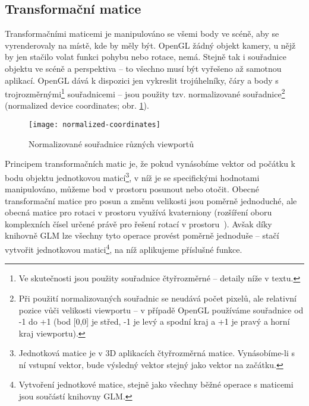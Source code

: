 \documentclass[a4paper, 11pt]{report}
\begin{document}
\subsection{Transformační matice}
Transformačními maticemi je manipulováno se všemi body ve scéně, aby se vyrenderovaly na místě, kde by měly být. OpenGL žádný objekt kamery, u nějž by jen stačilo volat funkci pohybu nebo rotace, nemá. Stejně tak i souřadnice objektu ve scéně a perspektiva -- to všechno musí být vyřešeno až samotnou aplikací. OpenGL dává k dispozici jen vykreslit trojúhelníky, čáry a body s trojrozměrnými\footnote{Ve skutečnosti jsou použity souřadnice čtyřrozměrné -- detaily níže v textu.} souřadnicemi -- jsou použity tzv. normalizované souřadnice\footnote{Při použití normalizovaných souřadnic se neudává počet pixelů, ale relativní pozice vůči velikosti viewportu -- v případě OpenGL používáme souřadnice od -1 do +1 (bod [0,0] je střed, -1 je levý a spodní kraj a +1 je pravý a horní kraj viewportu).} (normalized device coordinates; obr. \ref{normalized}). 

\begin{figure}[h]
	\centering
    \texttt{[image: normalized-coordinates]}
    \caption[Normalizované souřadnice]{\label{normalized}Normalizované souřadnice různých viewportů~\cite{pic:normalized-coordinates}}
\end{figure}

Principem transformačních matic je, že pokud vynásobíme vektor od počátku k bodu objektu jednotkovou maticí\footnote{Jednotková matice je v 3D aplikacích čtyřrozměrná matice. Vynásobíme-li s ní vstupní vektor, bude výsledný vektor stejný jako vektor na začátku.}, v níž je se specifickými hodnotami manipulováno, můžeme bod v prostoru posunout nebo otočit. Obecné transformační matice pro posun a změnu velikosti jsou poměrně jednoduché, ale obecná matice pro rotaci v prostoru využívá kvaterniony (rozšíření oboru komplexních čísel určené právě pro řešení rotací v prostoru~\cite{wiki:kvaterniony}). Avšak díky knihovně GLM lze všechny tyto operace provést poměrně jednoduše -- stačí vytvořit jednotkovou matici\footnote{Vytvoření jednotkové matice, stejně jako všechny běžné operace s maticemi jsou součástí knihovny GLM.}, na níž aplikujeme příslušné funkce.
\end{document}

